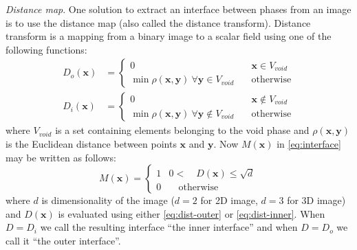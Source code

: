 \documentclass[reprint,amsmath,amssymb,aps,pre,showkeys,showpacs]{revtex4-1}
\begin{document}
\textit{Distance map}.
One solution to extract an interface between phases from an image is to use the
distance map (also called the distance transform). Distance transform is a
mapping from a binary image to a scalar field using one of the following
functions:
\begin{align}
  D_{o}(\mathbf{x}) &= \left\{
  \begin{array}{ll}
    0 & \quad \mathbf{x} \in V_{void} \\
    \min \rho(\mathbf{x}, \mathbf{y}) \ \forall \mathbf{y} \in V_{void} & \quad \text{otherwise}
  \end{array}
  \right. \label{eq:dist-outer} \\
  D_{i}(\mathbf{x}) &= \left\{
  \begin{array}{ll}
    0 & \quad \mathbf{x} \not\in V_{void} \\
    \min \rho(\mathbf{x}, \mathbf{y}) \ \forall \mathbf{y} \not\in V_{void} & \quad \text{otherwise}
  \end{array}
  \right. \label{eq:dist-inner}
\end{align}
where $V_{void}$ is a set containing elements belonging to the void phase and
$\rho(\mathbf{x}, \mathbf{y})$ is the Euclidean distance between points
$\mathbf{x}$ and $\mathbf{y}$. Now $M(\mathbf{x})$ in \cref{eq:interface} may be
written as follows:
\begin{equation*}
  M(\mathbf{x}) = \left\{
  \begin{array}{ll}
    1 & 0 < \quad D(\mathbf{x}) \le \sqrt{d} \\
    0 & \quad \text{otherwise}
  \end{array}
  \right.
\end{equation*}
where $d$ is dimensionality of the image ($d = 2$ for 2D image, $d = 3$ for 3D
image) and $D(\mathbf{x})$ is evaluated using either \cref{eq:dist-outer} or
\cref{eq:dist-inner}. When $D = D_i$ we call the resulting interface
``the inner interface'' and when $D = D_o$ we call it ``the outer interface''.
\end{document}
